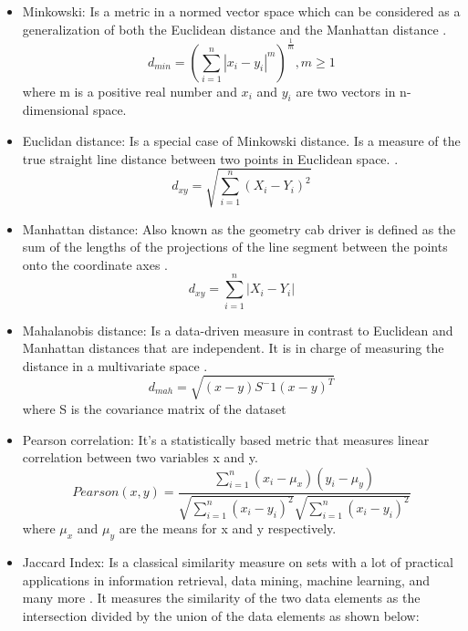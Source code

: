 \begin{itemize}
  \item Minkowski: Is a metric in a normed vector space which can be considered as a generalization of both the Euclidean distance and the Manhattan distance \citep{b56}.
    \begin{equation}
        d_{min} = (\sum_{i=1}^{n}|x_i - y_i|^m)^\frac{1}{m}, m\geq 1
    \end{equation}
    where m is a positive real number and $x_i$ and $y_i$ are two vectors in n-dimensional space.
    \item Euclidan distance: Is a special case of Minkowski distance. Is a measure of the true straight line distance between two points in Euclidean space. \citep{b57}.
    \begin{equation}
        d_{xy} =  \sqrt{\sum_{i=1}^{n}(X_{i}-Y_{i})^2}
    \end{equation}
     \item Manhattan distance: Also known as the geometry cab driver is defined as the
sum of the lengths of the projections of the line segment between the points onto the coordinate axes \citep{b58}.
     \begin{equation}
        d_{xy} =  \sum_{i=1}^{n}|X_{i}-Y_{i}|
    \end{equation}
    \item Mahalanobis distance: Is a data-driven measure in contrast to Euclidean and Manhattan distances that are independent. It is in charge of measuring the distance in a multivariate space \citep{b58}.
    \begin{equation}
        d_{mah}= \sqrt{(x-y)S^-1(x-y)^T}
    \end{equation}
    where S is the covariance matrix of the dataset
    \item Pearson correlation: It’s a statistically based metric that measures linear correlation between two variables x and y.
    \begin{equation}
        Pearson(x,y)= \frac{\sum_{i=1}^n(x_i-\mu_x)(y_i-\mu_y)}{\sqrt{\sum_{i=1}^n(x_i-y_i)^2}\sqrt{\sum_{i=1}^n(x_i-y_i)^2}}
    \end{equation}
    where $\mu_x$ and $\mu_y$ are the means for x and y respectively.
    \item Jaccard Index: Is a classical similarity measure on sets with a lot of practical applications in information retrieval, data mining, machine learning, and many more \citep{b35} \citep{b59}. It measures the similarity of the two data elements as the intersection divided by the union of the data elements as shown below:

\end{itemize}
